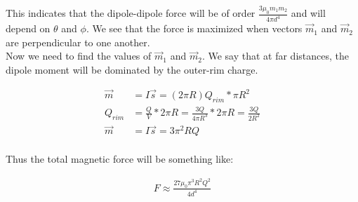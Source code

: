 \documentclass[10pt]{article} %
\begin{document}
This indicates that the dipole-dipole force will be of order $\frac{3\mu_0m_1m_2}{4\pi d^4}$ and will depend on $\theta$ and $\phi$.
We see that the force is maximized when vectors $\vec{m}_1$ and $\vec{m}_2$ are perpendicular to one another.\\

Now we need to find the values of $\vec{m}_1$ and $\vec{m}_2$. We say that at far distances, the dipole moment will be dominated
by the outer-rim charge.

\begin{align*}
  \vec{m} &= I\vec{s} = (2\pi R)Q_{rim} * \pi R^2\\
  Q_{rim} &= \frac{Q}{V} * 2\pi R = \frac{3Q}{4\pi R^3} * 2\pi R = \frac{3Q}{2R^2}\\
  \vec{m} &= I\vec{s} = 3\pi^2 RQ\\
\end{align*}

Thus the total magnetic force will be something like:

\begin{align*}
  F \approx \frac{27\mu_0\pi^3R^2Q^2}{4 d^4}
\end{align*}
\end{document}
